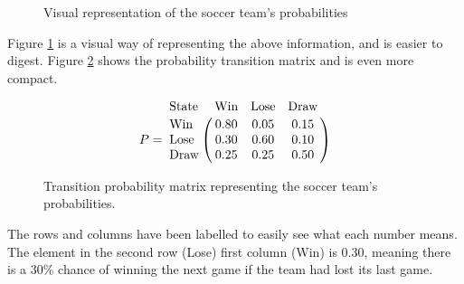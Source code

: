 \begin{figure}[h]
	\centering
	\caption{Visual representation of the soccer team's probabilities}
	\label{fig: soccer team visual}
\end{figure}

Figure \ref{fig: soccer team visual} is a visual way of representing the above information, and is easier to digest. Figure \ref{fig: soccer team transition matrix} shows the probability transition matrix and is even more compact.

\begin{figure}[H]
	\centering
	
$$P=\bordermatrix{\text{State} 	&\text{Win} &\text{Lose}& \text{Draw}\cr
			 	\text{Win} 	&   0.80  	&	0.05	&	0.15	\cr
		 	 	\text{Lose}	& 	0.30  	&	0.60	&	0.10	\cr
	 	 		\text{Draw}	&	0.25	&	0.25	&	0.50	}$$
 	 \caption{Transition probability matrix representing the soccer team's probabilities.}
 	 \label{fig: soccer team transition matrix}
\end{figure}

The rows and columns have been labelled to easily see what each number means. The element in the second row (Lose) first column (Win) is $0.30$, meaning there is a 30\% chance of winning the next game if the team had lost its last game.
\\

